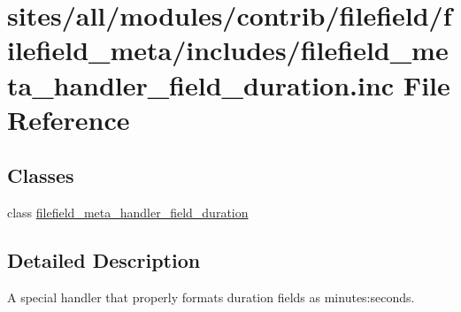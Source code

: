 \hypertarget{filefield__meta__handler__field__duration_8inc}{
\section{sites/all/modules/contrib/filefield/filefield\_\-meta/includes/filefield\_\-meta\_\-handler\_\-field\_\-duration.inc File Reference}
\label{filefield__meta__handler__field__duration_8inc}
}
\subsection*{Classes}
\begin{CompactItemize}
\item 
class \hyperlink{classfilefield__meta__handler__field__duration}{filefield\_\-meta\_\-handler\_\-field\_\-duration}
\end{CompactItemize}


\subsection{Detailed Description}
A special handler that properly formats duration fields as minutes:seconds. 